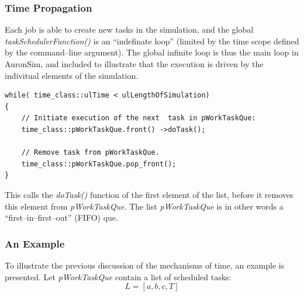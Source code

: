 	\subsubsection{Time Propagation}


%

	Each job is able to create new tasks in the simulation, and the global \emph{taskSchedulerFunction()} is an ``indefinate loop'' (limited by the time scope defined by the command--line argument).
	The global infinite loop is thus the main loop in AuronSim, and included to illustrate that the execution is driven by the indivitual elements of the simulation.

\begin{lstlisting}
while( time_class::ulTime < ulLengthOfSimulation)
{
	// Initiate execution of the next  task in pWorkTaskQue:
	time_class::pWorkTaskQue.front() ->doTask();

	// Remove task from pWorkTaskQue.
	time_class::pWorkTaskQue.pop_front();
}
\end{lstlisting}

	This calls the \emph{doTask()} function of the first element of the list, before it removes this element from \emph{pWorkTaskQue}.
	The list \emph{pWorkTaskQue} is in other words a ``first--in--first--out'' (FIFO) que. %
	
	\subsubsection{An Example}
	To illustrate the previous discussion of the mechanisms of time, an example is presented.
	Let \emph{pWorkTaskQue} contain a list of scheduled tasks: %
\begin{equation}
	\nonumber
	L = [a, b, c, T]
\end{equation}

